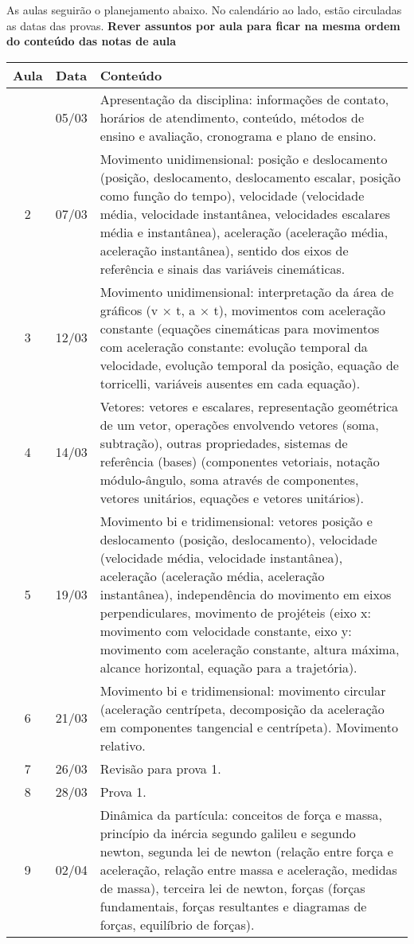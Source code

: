 As aulas seguirão o planejamento abaixo. No calendário ao lado, estão circuladas as datas das provas. \textbf{Rever assuntos por aula para ficar na mesma ordem do conteúdo das notas de aula}
\begin{center}
\begin{longtable}{ccp{70mm}}
\toprule
Aula & Data & Conteúdo \\
\midrule
\endhead
\bottomrule
\endfoot
1 & 05/03 & Apresentação da disciplina: informações de contato, horários de atendimento, conteúdo, métodos de ensino e avaliação, cronograma e plano de ensino. \\
2 & 07/03 & Movimento unidimensional: posição e deslocamento (posição, deslocamento, deslocamento escalar, posição como função do tempo), velocidade (velocidade média, velocidade instantânea, velocidades escalares média e instantânea), aceleração (aceleração média, aceleração instantânea), sentido dos eixos de referência e sinais das variáveis cinemáticas. \\
3 & 12/03 & Movimento unidimensional: interpretação da área de gráficos (v × t, a × t), movimentos com aceleração constante (equações cinemáticas para movimentos com aceleração constante: evolução temporal da velocidade, evolução temporal da posição, equação de torricelli, variáveis ausentes em cada equação). \\
4 & 14/03 & Vetores: vetores e escalares, representação geométrica de um vetor, operações envolvendo vetores (soma, subtração), outras propriedades, sistemas de referência (bases) (componentes vetoriais, notação módulo-ângulo, soma através de componentes, vetores unitários, equações e vetores unitários). \\
5 & 19/03 & Movimento bi e tridimensional: vetores posição e deslocamento (posição, deslocamento), velocidade (velocidade média, velocidade instantânea), aceleração (aceleração média, aceleração instantânea), independência do movimento em eixos perpendiculares, movimento de projéteis (eixo x: movimento com velocidade constante, eixo y: movimento com aceleração constante, altura máxima, alcance horizontal, equação para a trajetória). \\
6 & 21/03 & Movimento bi e tridimensional: movimento circular (aceleração centrípeta, decomposição da aceleração em componentes tangencial e centrípeta). Movimento relativo. \\
7 & 26/03 & Revisão para prova 1. \\
8 & 28/03 & Prova 1. \\
9 & 02/04 & Dinâmica da partícula: conceitos de força e massa, princípio da inércia segundo galileu e segundo newton, segunda lei de newton (relação entre força e aceleração, relação entre massa e aceleração, medidas de massa), terceira lei de newton, forças (forças fundamentais, forças resultantes e diagramas de forças, equilíbrio de forças). \\

\end{longtable}
\end{center}
